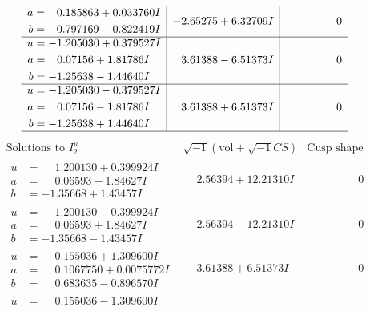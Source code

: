 \documentclass[1p]{elsarticle_modified}
\theoremstyle{definition}
\newcommand{\I}{\sqrt{-1}}
\begin{document}
$$\begin{array}{c|c|c}
\begin{aligned}
a &= \phantom{-}0.185863 + 0.033760 I \\
b &= \phantom{-}0.797169 - 0.822419 I\end{aligned}
 & -2.65275 + 6.32709 I & \phantom{-0.000000 } 0 \\ \hline\begin{aligned}
u &= -1.205030 + 0.379527 I \\
a &= \phantom{-}0.07156 + 1.81786 I \\
b &= -1.25638 - 1.44640 I\end{aligned}
 & \phantom{-}3.61388 - 6.51373 I & \phantom{-0.000000 } 0 \\ \hline\begin{aligned}
u &= -1.205030 - 0.379527 I \\
a &= \phantom{-}0.07156 - 1.81786 I \\
b &= -1.25638 + 1.44640 I\end{aligned}
 & \phantom{-}3.61388 + 6.51373 I & \phantom{-0.000000 } 0\\
 \hline 
 \end{array}$$\newpage$$\begin{array}{c|c|c}  
\text{Solutions to }I^u_{2}& \I (\text{vol} + \sqrt{-1}CS) & \text{Cusp shape}\\
 \hline 
\begin{aligned}
u &= \phantom{-}1.200130 + 0.399924 I \\
a &= \phantom{-}0.06593 - 1.84627 I \\
b &= -1.35668 + 1.43457 I\end{aligned}
 & \phantom{-}2.56394 + 12.21310 I & \phantom{-0.000000 } 0 \\ \hline\begin{aligned}
u &= \phantom{-}1.200130 - 0.399924 I \\
a &= \phantom{-}0.06593 + 1.84627 I \\
b &= -1.35668 - 1.43457 I\end{aligned}
 & \phantom{-}2.56394 - 12.21310 I & \phantom{-0.000000 } 0 \\ \hline\begin{aligned}
u &= \phantom{-}0.155036 + 1.309600 I \\
a &= \phantom{-}0.1067750 + 0.0075772 I \\
b &= \phantom{-}0.683635 - 0.896570 I\end{aligned}
 & \phantom{-}3.61388 + 6.51373 I & \phantom{-0.000000 } 0 \\ \hline\begin{aligned}
u &= \phantom{-}0.155036 - 1.309600 I \\

\end{aligned}
\end{array}$$
\end{document}

